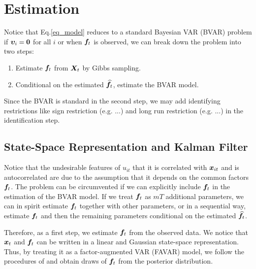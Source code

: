 \section{Estimation}
Notice that Eq.\eqref{eq_model} reduces to a standard Bayesian VAR (BVAR) problem if $\bm \upsilon_i=\boldsymbol{0}$ for all $i$ or when $\bm f_t$ is observed, we can break down the problem into two steps:
\begin{enumerate}
\item
Estimate $\bm f_t$ from $\bm X_t$ by Gibbs sampling.

\item
Conditional on the estimated $\widehat{\bm f}_t$, estimate the BVAR model.
\end{enumerate}

Since the BVAR is standard in the second step, we may add identifying restrictions like sign restriction (e.g. ...) and long run restriction (e.g. ...) in the identification step.

\subsection{State-Space Representation and Kalman Filter}
Notice that the undesirable features of $u_{it}$ that it is correlated with $\bm x_{it}$ and is autocorrelated are due to the assumption that it depends on the common factors $\bm f_t$. The problem can be circumvented if we can explicitly include $\bm f_t$ in the estimation of the BVAR model. If we treat $\bm f_t$ as $mT$ additional parameters, we can in spirit estimate $\bm f_t$ together with other parameters, or in a sequential way, estimate $\bm f_t$ and then the remaining parameters conditional on the estimated $\widehat{\bm f}_t$.

Therefore, as a first step, we estimate $\bm f_t$ from the observed data. We notice that $\bm x_t$ and $\bm f_t$ can be written in a linear and Gaussian state-space representation. Thus, by treating it as a factor-augmented VAR (FAVAR) model, we follow the procedures of \cite{FAVAR} and obtain draws of $\bm f_t$ from the posterior distribution.